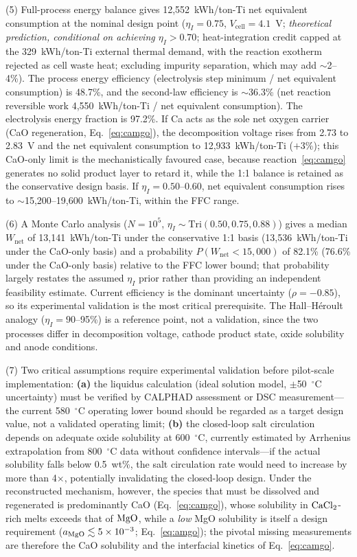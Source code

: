 \documentclass[11pt]{article}
\begin{document}
(5) Full-process energy balance gives 12{,}552~kWh/ton-Ti net equivalent consumption at the nominal design point ($\eta_I = 0.75$, $V_{\mathrm{cell}} = 4.1$~V; \emph{theoretical prediction, conditional on achieving $\eta_I > 0.70$}; heat-integration credit capped at the 329~kWh/ton-Ti external thermal demand, with the reaction exotherm rejected as cell waste heat; excluding impurity separation, which may add $\sim$2--4\%). The process energy efficiency (electrolysis step minimum / net equivalent consumption) is 48.7\%, and the second-law efficiency is $\sim$36.3\% (net reaction reversible work 4{,}550~kWh/ton-Ti / net equivalent consumption). The electrolysis energy fraction is 97.2\%. If Ca acts as the sole net oxygen carrier (CaO regeneration, Eq.~\ref{eq:camgo}), the decomposition voltage rises from 2.73 to 2.83~V and the net equivalent consumption to 12{,}933~kWh/ton-Ti ($+$3\%); this CaO-only limit is the mechanistically favoured case, because reaction~\ref{eq:camgo} generates no solid product layer to retard it, while the 1:1 balance is retained as the conservative design basis. If $\eta_I = 0.50$--0.60, net equivalent consumption rises to $\sim$15{,}200--19{,}600~kWh/ton-Ti, within the FFC range.

(6) A Monte Carlo analysis ($N = 10^5$, $\eta_I \sim \mathrm{Tri}(0.50, 0.75, 0.88)$) gives a median $W_{\mathrm{net}}$ of 13{,}141~kWh/ton-Ti under the conservative 1:1 basis (13{,}536~kWh/ton-Ti under the CaO-only basis) and a probability $P(W_{\mathrm{net}} < 15{,}000)$ of 82.1\% (76.6\% under the CaO-only basis) relative to the FFC lower bound; that probability largely restates the assumed $\eta_I$ prior rather than providing an independent feasibility estimate. Current efficiency is the dominant uncertainty ($\rho = -0.85$), so its experimental validation is the most critical prerequisite. The Hall--H\'eroult analogy ($\eta_I = 90$--95\%) \cite{kvande2014} is a reference point, not a validation, since the two processes differ in decomposition voltage, cathode product state, oxide solubility and anode conditions.

(7) Two critical assumptions require experimental validation before pilot-scale implementation: \textbf{(a)} the liquidus calculation (ideal solution model, $\pm$50~$^{\circ}$C uncertainty) must be verified by CALPHAD assessment or DSC measurement---the current 580~$^{\circ}$C operating lower bound should be regarded as a target design value, not a validated operating limit; \textbf{(b)} the closed-loop salt circulation depends on adequate oxide solubility at 600~$^{\circ}$C, currently estimated by Arrhenius extrapolation from 800~$^{\circ}$C data without confidence intervals---if the actual solubility falls below 0.5~wt\%, the salt circulation rate would need to increase by more than 4$\times$, potentially invalidating the closed-loop design. Under the reconstructed mechanism, however, the species that must be dissolved and regenerated is predominantly CaO (Eq.~\ref{eq:camgo}), whose solubility in $\ce{CaCl2}$-rich melts exceeds that of $\ce{MgO}$, while a \emph{low} MgO solubility is itself a design requirement ($a_{\ce{MgO}} \lesssim 5\times10^{-3}$; Eq.~\ref{eq:amgo}); the pivotal missing measurements are therefore the CaO solubility and the interfacial kinetics of Eq.~\ref{eq:camgo}.
\end{document}
